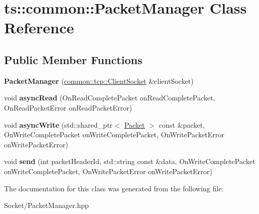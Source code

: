 \hypertarget{classts_1_1common_1_1_packet_manager}{}\section{ts\+:\+:common\+:\+:Packet\+Manager Class Reference}
\label{classts_1_1common_1_1_packet_manager}
\subsection*{Public Member Functions}
\begin{DoxyCompactItemize}
\item 
\mbox{\label{classts_1_1common_1_1_packet_manager_a3b73116e602124697590afecb82ef9fd}} 
{\bfseries Packet\+Manager} (\hyperlink{classts_1_1common_1_1tcp_1_1_client_socket}{common\+::tcp\+::\+Client\+Socket} \&client\+Socket)
\item 
\mbox{\label{classts_1_1common_1_1_packet_manager_a6165799da03af1c119d921ac96a24562}} 
void {\bfseries async\+Read} (On\+Read\+Complete\+Packet on\+Read\+Complete\+Packet, On\+Read\+Packet\+Error on\+Read\+Packet\+Error)
\item 
\mbox{\label{classts_1_1common_1_1_packet_manager_ae308b816f8cf10367f0f63fa5c1fadf4}} 
void {\bfseries async\+Write} (std\+::shared\+\_\+ptr$<$ \hyperlink{structts_1_1common_1_1_packet}{Packet} $>$ const \&packet, On\+Write\+Complete\+Packet on\+Write\+Complete\+Packet, On\+Write\+Packet\+Error on\+Write\+Packet\+Error)
\item 
\mbox{\label{classts_1_1common_1_1_packet_manager_aae446c8e99adc8ead7d4b0cd40545cd0}} 
void {\bfseries send} (int packet\+Header\+Id, std\+::string const \&data, On\+Write\+Complete\+Packet on\+Write\+Complete\+Packet, On\+Write\+Packet\+Error on\+Write\+Packet\+Error)
\end{DoxyCompactItemize}


The documentation for this class was generated from the following file\+:\begin{DoxyCompactItemize}
\item 
Socket/Packet\+Manager.\+hpp\end{DoxyCompactItemize}
